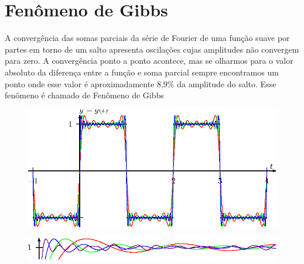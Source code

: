 \section{Fenômeno de Gibbs}
A convergência das somas parciais da série de Fourier de uma função suave por partes em torno de um salto apresenta oscilações cujas amplitudes não convergem para zero. A convergência ponto a ponto acontece, mas se olharmos para o valor absoluto da diferença entre a função e soma parcial sempre encontramos um ponto onde esse valor é aproximadamente 8,9\% da amplitude do salto. Esse fenômeno é chamado de Fenômeno de Gibbs
\begin{figure}[!ht]
\begin{center}
\includegraphics{cap_propriedades_series/pics/figura_2}\end{center}
\end{figure}
\begin{figure}[!ht]
\begin{center}
\includegraphics{cap_propriedades_series/pics/figura_3}\end{center}
\end{figure}
